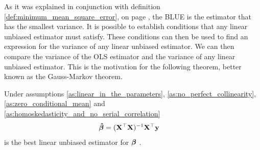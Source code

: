 As it was explained in conjunction with definition \ref{def:minimum_mean_square_error}, on page \pageref{def:minimum_mean_square_error}, the BLUE is the estimator that has the smallest variance.
It is possible to establish conditions that any linear unbiased estimator must satisfy.
These conditions can then be used to find an expression for the variance of any linear unbiased estimator.
We can then compare the variance of the OLS estimator and the variance of any linear unbiased estimator.
This is the motivation for the following theorem, better known as the Gauss-Markov theorem.
\begin{theorem}
    Under assumptions \ref{as:linear_in_the_parameters}, \ref{as:no_perfect_collinearity}, \ref{as:zero_conditional_mean} and \ref{as:homoskedasticity_and_no_serial_correlation} 
    \begin{align}\label{eq:betahat_y}
        \operatorname{\boldsymbol{\hat{\beta}}} &= (\mathbf{X}^\top\mathbf{X})^{-1}\mathbf{X}^\top\mathbf{y}
    \end{align}
    is the best linear unbiased estimator for $\operatorname{\boldsymbol{\beta}}$ \cite[p. 811]{Wooldridge2012}.
\end{theorem}\label{th:gauss_markoc_theorem}
